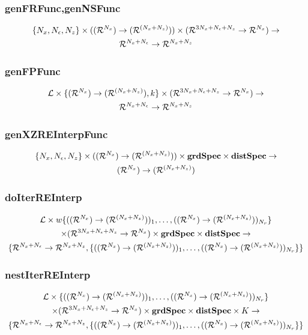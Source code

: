 \documentclass[tikz]{beamer}
\begin{document}
\begin{frame}
\frametitle{genFRFunc,genNSFunc}
\begin{gather*}
\{\numX,\numEps,\numZ\}\times(\xzFuncGuessSig)\times (\eqnFuncSig)    \rightarrow\\
\frfpnsFuncSig
\end{gather*}
\end{frame}

\begin{frame}
\frametitle{genFPFunc}
\label{sec:genfpfunc}
\begin{gather*}
\linMod \times \{  \bigXFuncSig, k \} \times (\eqnFuncSig)    \rightarrow\\ 
\frfpnsFuncSig
\end{gather*}

\end{frame}


\begin{frame}
\frametitle{genXZREInterpFunc}
\label{sec:genfpfunc}
\begin{gather*}
\{\numX,\numEps,\numZ\}\times(\xzFuncGuessSig)\times \grdSpec \times  \dstSpec   \rightarrow\\
\bigXFuncSig
\end{gather*}



\end{frame}

\begin{frame}
\frametitle{doIterREInterp}
\label{sec:doiterreinterp}

\begin{gather*}
  \linMod \times 
w\{(\xzFuncGuessSig)_1,\ldots,(\xzFuncGuessSig)_{\numR}\}  \\
 \times (\eqnFuncSig ) \times \grdSpec \times \dstSpec \rightarrow\\
\{\frfpnsFuncSig, \{(\xzFuncGuessSig)_1,\ldots,(\xzFuncGuessSig)_{\numR}\}\}
\end{gather*}



\end{frame}



\begin{frame}
\frametitle{nestIterREInterp}
\label{sec:nestiterreinterp}



\begin{gather*}
  \linMod \times 
\{(\xzFuncGuessSig)_1,\ldots,(\xzFuncGuessSig)_{\numR}\}  \\
 \times (\eqnFuncSig ) \times \grdSpec \times \dstSpec \times \numIters \rightarrow\\
\{\frfpnsFuncSig, \{(\xzFuncGuessSig)_1,\ldots,(\xzFuncGuessSig)_{\numR}\}\}
\end{gather*}



\end{frame}
\end{document}
